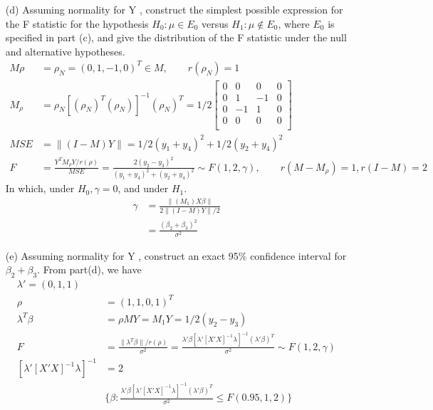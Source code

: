 \begin{itemize}
\item[(d)] Assuming normality for Y , construct the simplest possible expression for
the F statistic for the hypothesis $H_0: \mu \in E_0$ versus $H_1: \mu \not\in E_0$, where $E_0$ is
specified in part (c), and give the distribution of the F statistic under the null and
alternative hypotheses.\\
\begin{align*}
    M\rho &=  \rho_N= (0, 1, -1, 0)^T \in M, \qquad r(\rho_N) = 1\\
    M_{\rho} &= \rho_N [(\rho_N)^T (\rho_N)]^{-1} (\rho_N)^T=1/2 \begin{bmatrix}
           0  & 0 & 0 & 0  \\
           0 &  1 & -1 & 0\\
           0  & -1 & 1 & 0 \\
           0 & 0 & 0 & 0\\
         \end{bmatrix}\\
    MSE &= \lVert (I-M)Y \rVert = 1/2 (y_1+y_4)^2 + 1/2 (y_2 + y_4)^2 \\
    F &= \frac{Y^T M_{\rho} Y/r(\rho)}{MSE} = \frac{2(y_2 - y_3)^2}{(y_1+y_4)^2 + (y_2 + y_4)^2} \sim F(1,2, \gamma), \qquad r(M-M_{\rho}) = 1, r(I-M) = 2
\end{align*} 
In which, under $H_0, \gamma = 0$, and under $H_1$.
\begin{align*}
    \gamma &= \frac{\lVert (M_1) X\beta \rVert}{2 \lVert (I-M)Y \rVert/2}\\
    &= \frac{(\beta_2 + \beta_3)^2}{\sigma^2}
\end{align*} 

\item[(e)] Assuming normality for Y , construct an exact 95$\%$ confidence interval for $\beta_2 + \beta_3$.
From part(d), we have
\begin{align*}
 \lambda' = (0, 1, 1)\\
 \rho &= (1, 1, 0, 1)^T\\
 \lambda^T \beta &=  \rho M Y = M_1 Y= 1/2 (y_2 - y_3)\\
  F &= \frac{\lVert \lambda^T \beta \rVert/r(\rho)}{\sigma^2} = \frac{\lambda'\beta [\lambda'[X'X]^{-1} \lambda]^{-1} (\lambda'\beta)^T }{\sigma^2} \sim F(1,2, \gamma)\\
  [\lambda'[X'X]^{-1} \lambda]^{-1} & = 2\\
 &\{\beta: \frac{\lambda'\beta [\lambda'[X'X]^{-1} \lambda]^{-1} (\lambda'\beta)^T }{\sigma^2} \leq F(0.95, 1,2) \} 
\end{align*} 

\end{itemize}
